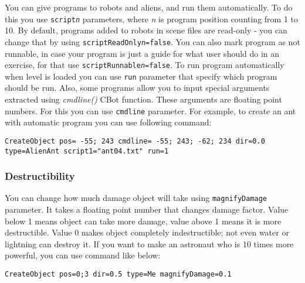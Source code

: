 You can give programs to robots and aliens, and run them automatically. To do this you use \texttt{script\emph{n}} parameters, where \emph{n} is program position counting from 1 to 10.
By default, programs added to robots in scene files are read-only - you can change that by using \texttt{scriptReadOnly\emph{n}=false}. You can also mark program as not runnable, in case your program is just a guide for what user should do in an exercise, for that use \texttt{scriptRunnable\emph{n}=false}.
To run program automatically when level is loaded you can use \texttt{run} parameter that specify which program should be run. Also, some programs allow you to input special arguments extracted using \emph{cmdline()} CBot function. These arguments are floating point numbers. For this you can use \texttt{cmdline} parameter. For example, to create an ant with automatic program you can use following command:

\begin{lstlisting}[style=scene]
CreateObject pos= -55; 243 cmdline= -55; 243; -62; 234 dir=0.0 type=AlienAnt script1="ant04.txt" run=1
\end{lstlisting}


\subsubsection{Destructibility}

You can change how much damage object will take using \texttt{magnifyDamage} parameter. It takes a floating point number that changes damage factor. Value below 1 means object can take more damage, value above 1 means it is more destructible. Value 0 makes object completely indestructible; not even water or lightning can destroy it. If you want to make an astronaut who is 10 times more powerful, you can use command like below:

\begin{lstlisting}[style=scene]
CreateObject pos=0;3 dir=0.5 type=Me magnifyDamage=0.1
\end{lstlisting}


